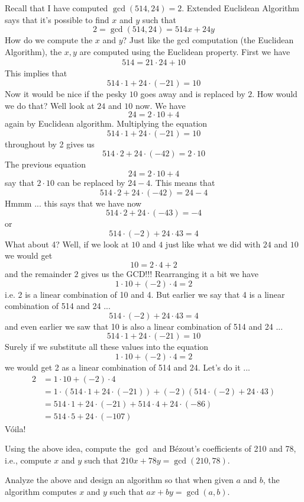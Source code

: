Recall that I have computed $\gcd(514, 24) = 2$.
Extended Euclidean Algorithm says that it's possible to find $x$ and $y$
such that
\[
2 = \gcd(514, 24) = 514x + 24y
\]
How do we compute the $x$ and $y$?
Just like the gcd computation (the Euclidean Algorithm),
the $x,y$ are computed using the Euclidean property.
First we have
\begin{align*}
514 = 21 \cdot 24 + 10
\end{align*}
This implies that 
\[
514 \cdot 1 + 24 \cdot (-21) = 10
\]
Now it would be nice if the pesky $10$ goes away and is replaced by
$2$.
How would we do that?
Well look at $24$ and $10$ now.
We have
\[
24 = 2 \cdot 10 + 4
\]
again by Euclidean algorithm.
Multiplying the equation
\[
514 \cdot 1 + 24 \cdot (-21) = 10
\]
throughout by 2 gives us
\[
514 \cdot 2 + 24 \cdot (-42) = 2 \cdot 10
\]
The previous equation
\[
24 = 2 \cdot 10 + 4
\]
say that $2 \cdot 10$ can be replaced by $24 - 4$.
This means that
\[
514 \cdot 2 + 24 \cdot (-42) = 24 - 4
\]
Hmmm ... this says that we have now
\[
514 \cdot 2 + 24 \cdot (-43) = -4
\]
or
\[
514 \cdot (-2) + 24 \cdot 43 = 4
\]
What about 4?
Well, if we look at $10$ and $4$ just like what we did with $24$ and $10$
we would get
\[
10 = 2 \cdot 4 + 2
\]
and the remainder $2$ gives us the GCD!!!
Rearranging it a bit we have
\[
1 \cdot 10 + (-2) \cdot 4 = 2
\]
i.e. 2 is a linear combination of 10 and 4.
But earlier we say that 4 is a linear combination of 514 and 24 ...
\[
514 \cdot (-2) + 24 \cdot 43 = 4
\]
and even earlier we saw that 10 is also a linear combination of 514 and 24 ...
\[
514 \cdot 1 + 24 \cdot (-21) = 10
\]
Surely if we substitute all these values into the equation
\[
1 \cdot 10 + (-2) \cdot 4 = 2
\]
we would get 2 as a linear combination of 514 and 24.
Let's do it ...
\begin{align*}
2 
&= 1 \cdot 10 + (-2) \cdot 4 \\
&= 1 \cdot (514 \cdot 1 + 24 \cdot (-21)) + (-2) (514 \cdot (-2) + 24 \cdot 43) \\
&= 514 \cdot 1 + 24 \cdot (-21) + 514 \cdot 4 + 24 \cdot (-86) \\
&= 514 \cdot 5 + 24 \cdot (-107)
\end{align*}
V\'oila!

\newpage
\begin{ex}
  Using the above idea,
  compute the $\gcd$ and B\'ezout's coefficients of 210 and 78, i.e.,
  compute $x$ and $y$ such that $210x + 78y = \gcd(210, 78)$.
\end{ex}

\newpage
\begin{ex}
Analyze the above and design an algorithm 
so that when given $a$ and $b$, the algorithm computes
$x$ and $y$ such that $ax + by = \gcd(a,b)$.
\end{ex}

